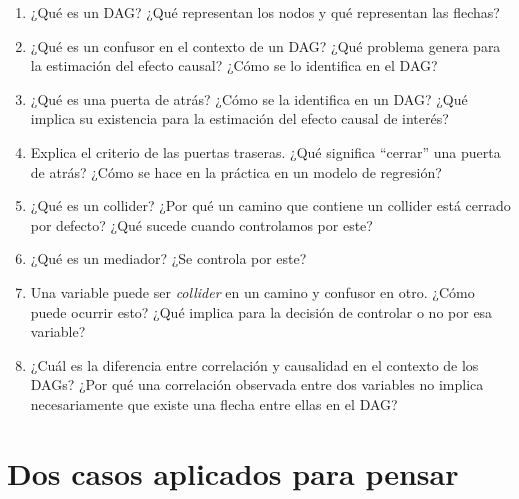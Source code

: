 \documentclass[
  letterpaper,
  DIV=11,
  numbers=noendperiod,
  oneside]{scrreprt}
\begin{document}
\begin{enumerate}
\def\labelenumi{\arabic{enumi}.}
\item
  ¿Qué es un DAG? ¿Qué representan los nodos y qué representan las
  flechas?
\item
  ¿Qué es un confusor en el contexto de un DAG? ¿Qué problema genera
  para la estimación del efecto causal? ¿Cómo se lo identifica en el
  DAG?
\item
  ¿Qué es una puerta de atrás? ¿Cómo se la identifica en un DAG? ¿Qué
  implica su existencia para la estimación del efecto causal de interés?
\item
  Explica el criterio de las puertas traseras. ¿Qué significa ``cerrar''
  una puerta de atrás? ¿Cómo se hace en la práctica en un modelo de
  regresión?
\item
  ¿Qué es un collider? ¿Por qué un camino que contiene un collider está
  cerrado por defecto? ¿Qué sucede cuando controlamos por este?
\item
  ¿Qué es un mediador? ¿Se controla por este?
\item
  Una variable puede ser \emph{collider} en un camino y confusor en
  otro. ¿Cómo puede ocurrir esto? ¿Qué implica para la decisión de
  controlar o no por esa variable?
\item
  ¿Cuál es la diferencia entre correlación y causalidad en el contexto
  de los DAGs? ¿Por qué una correlación observada entre dos variables no
  implica necesariamente que existe una flecha entre ellas en el DAG?
\end{enumerate}

\hypertarget{dos-casos-aplicados-para-pensar}{%
\section{Dos casos aplicados para
pensar}\label{dos-casos-aplicados-para-pensar}}
\end{document}
